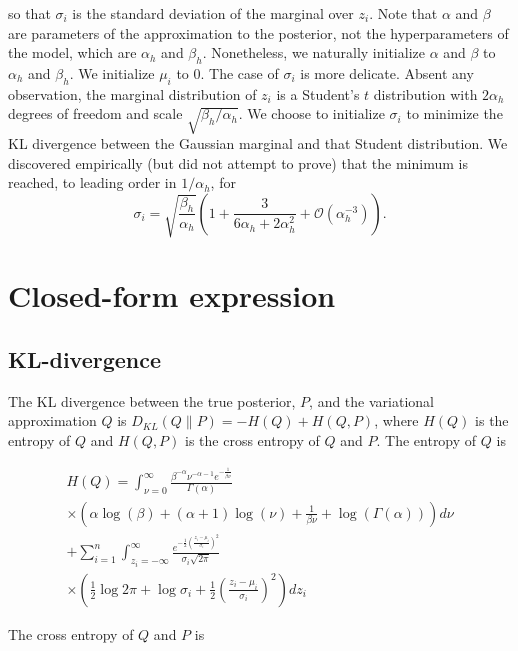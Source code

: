 \documentclass[12pt]{article}
\begin{document}
so that $\sigma_i$ is the standard deviation of the marginal over $z_i$.
Note that $\alpha$ and $\beta$ are parameters of the approximation to the posterior, not the hyperparameters of the model, which are
$\alpha_h$ and $\beta_h$. Nonetheless, we naturally initialize $\alpha$ and $\beta$ to $\alpha_h$ and $\beta_h$. We initialize $\mu_i$ to $0$.
The case of $\sigma_i$ is more delicate. Absent any observation, the marginal distribution of $z_i$ is a Student's $t$ distribution with
$2 \alpha_h$ degrees of freedom and scale $\sqrt{\beta_h / \alpha_h}$. We choose to initialize $\sigma_i$ to minimize the KL divergence between
the Gaussian marginal and that Student distribution. We discovered empirically (but did not attempt to prove) that the minimum is reached, to
leading order in $1/\alpha_h$, for
$$\sigma_i = \sqrt{\frac{\beta_h}{\alpha_h}}\left(1 + \frac{3}{6 \alpha_h + 2 \alpha_h^2} + \mathcal{O}(\alpha_h^{-3})\right).$$


\section{Closed-form expression}
\label{sec:closedform}

\subsection{KL-divergence}

The KL divergence between the true posterior, $P$, and the variational approximation $Q$ is $D_{KL}(Q\|P) = - H(Q) + H(Q,P)$,
where $H(Q)$ is the entropy of $Q$ and $H(Q,P)$ is the cross entropy of $Q$ and $P$. The entropy of $Q$ is

\begin{multline*}
    H(Q) = \int_{\nu=0}^{\infty} \frac{\beta^{-\alpha}\nu^{-\alpha-1}e^{-\frac{1}{\beta \nu}}}{\Gamma(\alpha) } \\
    \times \left(\alpha \log(\beta) + (\alpha+1)\log(\nu) + \frac{1}{\beta \nu} + \log(\Gamma(\alpha))\right)
    d\nu \\
    + \sum_{i=1}^n \int_{z_i=-\infty}^{\infty} \frac{e^{-\frac{1}{2}\left(\frac{z_i-\mu_i}{\sigma_i}\right)^2}}{\sigma_i \sqrt{2 \pi}} \\
    \times \left(\frac{1}{2} \log{2\pi} + \log{\sigma_i} + \frac{1}{2}\left(\frac{z_i-\mu_i}{\sigma_i}\right)^2\right) dz_i
\end{multline*}


The cross entropy of $Q$ and $P$ is
\end{document}
